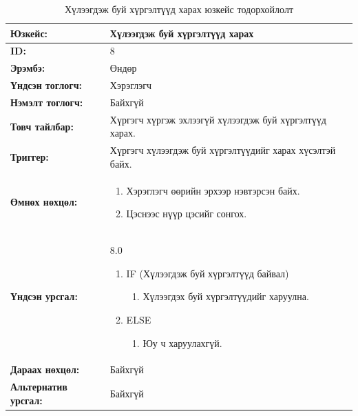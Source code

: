 \begin{table}[H]
    \caption{Хүлээгдэж буй хүргэлтүүд харах юзкейс тодорхойлолт}
    \begin{tabular}{|l|p{9cm}|}
		\hline
		{\bfseries Юзкейс:} & Хүлээгдэж буй хүргэлтүүд харах \\\hline
		{\bfseries ID:} & 8 \\\hline
		{\bfseries Эрэмбэ:} & Өндөр \\\hline
		{\bfseries Үндсэн тоглогч:} & Хэрэглэгч \\\hline
		{\bfseries Нэмэлт тоглогч:} & Байхгүй \\\hline
		{\bfseries Товч тайлбар:} & Хүргэгч хүргэж эхлээгүй хүлээгдэж буй хүргэлтүүд харах. \\\hline
		{\bfseries Триггер:} & Хүргэгч хүлээгдэж буй хүргэлтүүдийг харах хүсэлтэй байх. \\\hline
		{\bfseries Өмнөх нөхцөл:} &
		    \begin{enumerate}[nosep]
		        \item Хэрэглэгч өөрийн эрхээр нэвтэрсэн байх.
		        \item Цэснээс нүүр цэсийг сонгох.
		    \end{enumerate}
		\\\hline
		{\bfseries Үндсэн урсгал:} &
			8.0
			\begin{enumerate}[nosep]
				\item IF (Хүлээгдэж буй хүргэлтүүд байвал)
				    \begin{enumerate}[nosep]
		                \item Хүлээгдэх буй хүргэлтүүдийг харуулна.
				    \end{enumerate}
				\item ELSE
				    \begin{enumerate}[nosep]
		                \item Юу ч харуулахгүй.
				    \end{enumerate}
			\end{enumerate}
		\\\hline
		{\bfseries Дараах нөхцөл:} & Байхгүй \\\hline
		{\bfseries Альтернатив урсгал:} & Байхгүй \\\hline
    \end{tabular}
\end{table}

